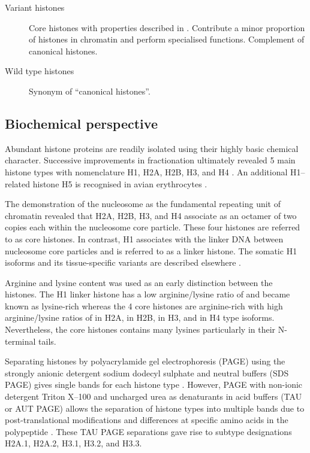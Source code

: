 {\begin{shaded}
\begin{description}
        \item[Variant histones] \hfill \newline
        Core histones with properties described in .
        Contribute a minor proportion of histones in chromatin and perform specialised functions.
        Complement of canonical histones.

        \item[Wild type histones] \hfill \newline
        Synonym of ``canonical histones''.
      \end{description}
    \end{shaded}
  }

  \subsection{Biochemical perspective}

    Abundant histone proteins are readily isolated using their
    highly basic chemical character.
    Successive improvements in fractionation ultimately revealed 5 main histone types
    with nomenclature H1, H2A, H2B, H3, and H4 \citep{nomenclature}.
    An additional H1--related histone H5 is recognised in avian erythrocytes \citep{HFive-review}.

    The demonstration of the nucleosome as the fundamental
    repeating unit of chromatin \citep{Kornberg1974}
    revealed that H2A, H2B, H3, and H4 associate as an octamer of two copies each within the
    nucleosome core particle. These four histones are referred to as core histones.
    In contrast, H1 associates with the linker DNA between nucleosome core particles
    and is referred to as a linker histone.
    The somatic H1 isoforms and its tissue-specific
    variants are described elsewhere \citep{HarshmanFreitas2013}.

    Arginine and lysine content was used as an early distinction between the histones.
    The H1 linker histone has a low arginine/lysine ratio
    of \LinkerArgLysRatio{} and became known as lysine-rich
    whereas the 4 core histones are arginine-rich
    with high arginine/lysine ratios of \HTwoAArgLysRatio{} in H2A, \HTwoBArgLysRatio{} in H2B,
    \HThreeArgLysRatio{} in H3, and \HFourArgLysRatio{} in H4 type isoforms.
    Nevertheless, the core histones contains many lysines particularly in their N-terminal tails.

    Separating histones by polyacrylamide gel electrophoresis (PAGE)
    using the strongly anionic detergent sodium dodecyl sulphate and neutral buffers (SDS PAGE)
    gives single bands for each histone type \citep{ShechterHake2007}.
    However, PAGE with non-ionic detergent Triton X--100 and uncharged urea as denaturants
    in acid buffers (TAU or AUT PAGE) allows the separation
    of histone types into multiple bands
    due to post-translational modifications and differences at specific amino acids
    in the polypeptide \citep{Zweidler1977}.
    These TAU PAGE separations gave rise to subtype designations
    H2A.1, H2A.2, H3.1, H3.2, and H3.3.

